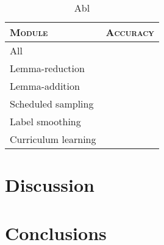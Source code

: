 \documentclass[11pt,a4paper]{article}
\begin{document}
\begin{table}[h]	
\centering
\begin{tabular}{lc}
\textsc{Module} & \textsc{Accuracy} \\
  \hline
  All  & \\
  Lemma-reduction & \\
  Lemma-addition & \\
  Scheduled sampling & \\
  Label smoothing & \\
  Curriculum learning & \\
\end{tabular} 
\caption{Abl}
\label{tab:abl}
\end{table}

\section{Discussion}

\section{Conclusions}







\end{document}
